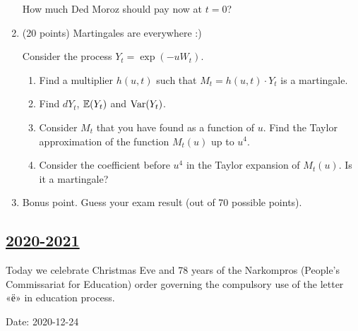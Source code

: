\begin{enumerate}
  How much Ded Moroz should pay now at $t=0$?
  
  
  \item (20 points) Martingales are everywhere :)
  
  Consider the process $Y_t = \exp( - u W_t)$. 
  
  \begin{enumerate}
    \item Find a multiplier $h(u, t)$ such that $M_t = h(u, t) \cdot Y_t$ is a martingale. 
    \item Find $dY_t$, $\operatorname{\mathbb{E}}(Y_t)$ and $\operatorname{Var}(Y_t)$.
    \item Consider $M_t$ that you have found as a function of $u$. 
    Find the Taylor approximation of the function $M_t(u)$ up to $u^4$. 
    \item Consider the coefficient before $u^4$ in the Taylor expansion of $M_t(u)$. 
    Is it a martingale?
  \end{enumerate}
  
  \item Bonus point. Guess your exam result (out of 70 possible points). 
  
  \end{enumerate}
  
      

\subsection[2020-2021]{\hyperref[sec:sol_kr_02_2020_2021]{2020-2021}}
\label{sec:kr_02_2020_2021} %



Today we celebrate Christmas Eve and 78 years of the Narkompros (People's Commissariat for Education) order governing the compulsory use of the letter «ё» in education process.

Date: 2020-12-24

